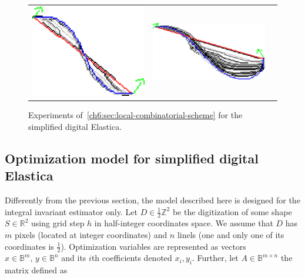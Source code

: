 \begin{figure}[]
\begin{tabular}{ccc}
\includegraphics[scale=0.25]{figures/chapter5/fixed-orientations/selastica/len_pen_0.01/curve-2/summary.pdf} &
\includegraphics[scale=0.25]{figures/chapter5/fixed-orientations/selastica/len_pen_0.01/curve-3/summary.pdf}
\end{tabular}
\caption{Experiments of~\cref{ch6:sec:local-combinatorial-scheme} for the simplified digital Elastica.}
\label{fig:simplified-elastica}
\end{figure}


\subsection{Optimization model for simplified digital Elastica}
\label{ch6:subsec:optimization-model-simplified-digital-elastica}

Differently from the previous section, the model described here is designed for the integral invariant estimator only. Let $D \in \frac{1}{2}\mathbb{Z}^2$ be the digitization of some shape $S \in \mathbb{R}^2$ using grid step $h$ in half-integer coordinates space. We assume that $D$ has $m$ pixels (located at integer coordinates) and $n$ linels (one and only one of its coordinates is $\frac{1}{2}$). Optimization variables are represented as vectors $x \in \mathbb{B}^{m},\, y \in \mathbb{B}^{n}$ and its $i$th coefficients denoted  $x_i,y_i$.  Further, let $A \in \mathbb{B}^{m\times n}$ the matrix defined as

